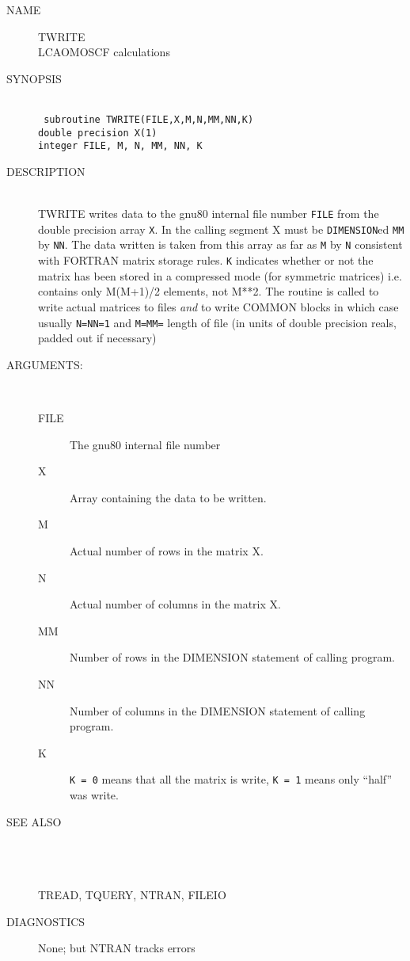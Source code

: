 \newpage
\setcounter{page}{1}
\begin{description}
\item[NAME] TWRITE \\
LCAOMOSCF calculations
\item[SYNOPSIS] \ \\
{\tt
   subroutine TWRITE(FILE,X,M,N,MM,NN,K) \\
   double precision X(1) \\
   integer FILE, M, N, MM, NN, K \\
}
\item[DESCRIPTION] \ \\
TWRITE writes data to the gnu80 internal file number {\tt FILE}
from the double precision array {\tt X}. In the calling segment
X must be {\tt DIMENSION}ed {\tt MM} by {\tt NN}. The data written
is taken from this array as far as {\tt M} by {\tt N} consistent
with FORTRAN matrix storage rules. {\tt K} indicates whether or
not the matrix has been stored in a compressed mode (for symmetric
matrices) i.e. contains only M(M+1)/2 elements, not M**2.
The routine is called to write actual matrices to files {\em and}
to write COMMON blocks in which case usually {\tt N=NN=1}
and {\tt M=MM=} length of file (in units of double precision reals,
padded out if necessary)
\item[ARGUMENTS:] \ \\
\begin{description}
\item[FILE]  The gnu80 internal file number
\item[X] Array containing the data to be written.
\item[M] Actual number of rows in the matrix X.
\item[N] Actual number of columns in the matrix X.
\item[MM] Number of rows in the DIMENSION statement of calling program.
\item[NN] Number of columns in the DIMENSION statement of calling program.
\item[K] {\tt K = 0} means that all the matrix is write, {\tt K = 1}
means only ``half'' was write.
\end{description}
\item[SEE ALSO] \\ \\\\
TREAD, TQUERY, NTRAN, FILEIO
\item[DIAGNOSTICS]
None; but NTRAN tracks errors
\end{description}
